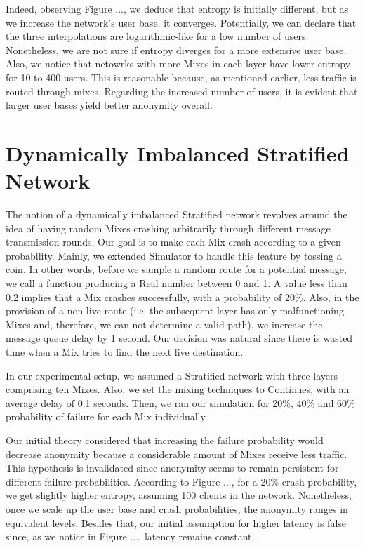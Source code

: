 \documentclass[logo,msc,cyber]{infthesis}   %
\begin{document}
Indeed, observing Figure ..., we deduce that entropy is initially different, but
as we increase the network's user base, it converges. Potentially, we can
declare that the three interpolations are logarithmic-like for a low number of
users. Nonetheless, we are not sure if entropy diverges for a more extensive
user base. Also, we notice that netowrks with more Mixes in each layer have
lower entropy for 10 to 400 users. This is reasonable because, as mentioned
earlier, less traffic is routed through mixes. Regarding the increased number of
users, it is evident that larger user bases yield better anonymity overall.


\section{Dynamically Imbalanced Stratified Network}
The notion of a dynamically imbalanced Stratified network revolves around the
idea of having random Mixes crashing arbitrarily through different message
transmission rounds. Our goal is to make each Mix crash according to a given
probability. Mainly, we extended Simulator to handle this feature by tossing a
coin. In other words, before we sample a random route for a potential message,
we call a function producing a Real number between 0 and 1. A value less than
0.2 implies that a Mix crashes successfully, with a probability of 20\%. Also,
in the provision of a non-live route (i.e. the subsequent layer has only
malfunctioning Mixes and, therefore, we can not determine a valid path), we
increase the message queue delay by 1 second. Our decision was natural since
there is wasted time when a Mix tries to find the next live destination.

In our experimental setup, we assumed a Stratified network with three layers
comprising ten Mixes. Also, we set the mixing techniques to Continues, with an
average delay of 0.1 seconds. Then, we ran our simulation for 20\%, 40\% and 60\%
probability of failure for each Mix individually. 

Our initial theory considered that increasing the failure probability would
decrease anonymity because a considerable amount of Mixes receive less traffic.
This hypothesis is invalidated since anonymity seems to remain persistent for
different failure probabilities. According to Figure ..., for a 20\% crash
probability, we get slightly higher entropy, assuming 100 clients in the
network. Nonetheless, once we scale up the user base and crash probabilities,
the anonymity ranges in equivalent levels. Besides that, our initial assumption
for higher latency is false since, as we notice in Figure ..., latency remains
constant. 
\end{document}
